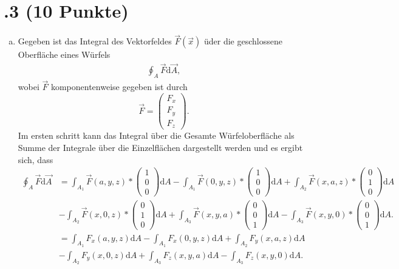 \section*{\nr.3 \titthree (10 Punkte)}
\begin{enumerate}[(a)]
<<<<<<< HEAD
\item  Gegeben ist das Integral des Vektorfeldes $\vec{F}(\vec{x})$ üder die geschlossene Oberfläche eines Würfels
\begin{align}
\oint_A \vec{F}\mathrm{d}\vec{A},
\end{align}
wobei $\vec{F}$ komponentenweise gegeben ist durch
\begin{equation*}
	\vec{F} = \begin{pmatrix}F_x \\ F_y \\ F_z \end{pmatrix}.
\end{equation*}
Im ersten schritt kann das Integral über die Gesamte Würfeloberfläche als Summe der Integrale über die Einzelflächen dargestellt werden und es ergibt sich, dass 
\begin{align*}
\oint_A \vec{F}\mathrm{d}\vec{A}  &= \int_{A_{1}} \vec{F}(a,y,z)*\begin{pmatrix}1 \\ 0 \\ 0 \end{pmatrix} \mathrm{d}A - \int_{A_{1}} \vec{F}(0,y,z)*\begin{pmatrix}1 \\ 0 \\ 0 \end{pmatrix}\mathrm{d}A + \int_{A_{2}} \vec{F}(x,a,z)*\begin{pmatrix}0 \\ 1 \\ 0 \end{pmatrix}\mathrm{d}A \\ & - \int_{A_{2}} \vec{F}(x,0,z)*\begin{pmatrix}0 \\ 1 \\ 0 \end{pmatrix}\mathrm{d}A + \int_{A_{3}} \vec{F}(x,y,a)*\begin{pmatrix}0 \\ 0 \\ 1 \end{pmatrix}\mathrm{d}A - \int_{A_{3}} \vec{F}(x,y,0)*\begin{pmatrix} 0 \\ 0 \\ 1 \end{pmatrix}\mathrm{d}A.\\ & = \int_{A_{1}} F_{x}(a,y,z) \mathrm{d}A - \int_{A_{1}} F_{x}(0,y,z)\mathrm{d}A + \int_{A_{2}} F_{y}(x,a,z)\mathrm{d}A \\ & - \int_{A_{2}} F_{y}(x,0,z)\mathrm{d}A + \int_{A_{3}} F_{z}(x,y,a)\mathrm{d}A - \int_{A_{3}} F_{z}(x,y,0)\mathrm{d}A.

\end{align*}
\end{enumerate}
